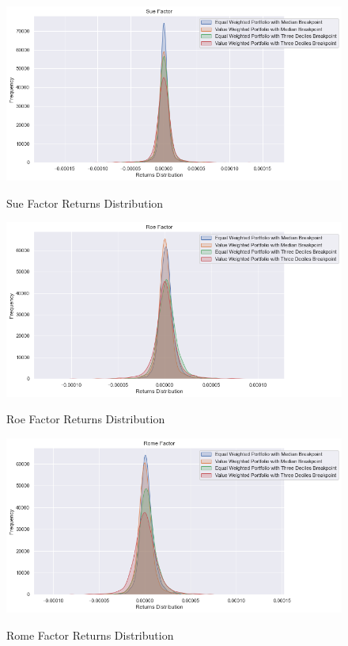 \begin{figure}[H]
	\caption{Sue Factor Returns Distribution}
	\centering
	\includegraphics[scale=.63]{../../output/figures/sue.png}
	\label{fig:sue}
\end{figure}

\begin{figure}[H]
	\caption{Roe Factor Returns Distribution}
	\centering
	\includegraphics[scale=.63]{../../output/figures/roe.png}
	\label{fig:roe}
\end{figure}

\begin{figure}[H]
	\caption{Rome Factor Returns Distribution}
	\centering
	\includegraphics[scale=.63]{../../output/figures/rome.png}
	\label{fig:rome}
\end{figure}

